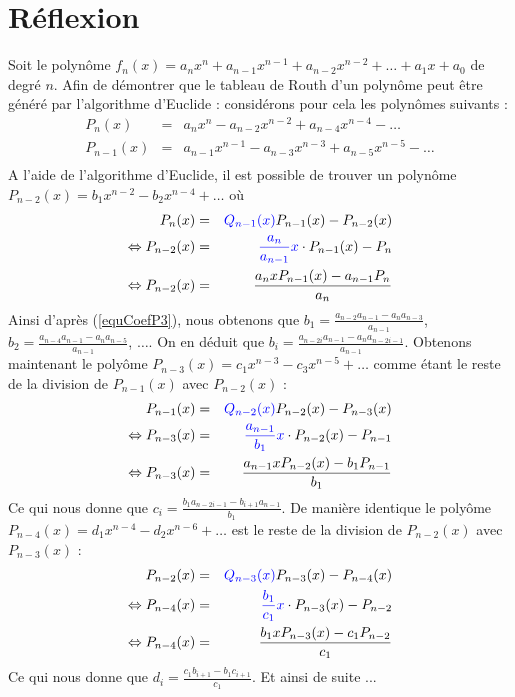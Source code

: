 \documentclass[11pt]{article}
\begin{document}
\clearpage
\section*{Réflexion}
Soit le polynôme $f_n(x) = a_n x^{n} + a_{n-1}x^{n-1} + a_{n-2}x^{n-2}+\dots + a_1x+a_0$ de degré $n$. Afin de démontrer que le tableau de Routh d'un polynôme
peut être généré par l'algorithme d'Euclide : considérons pour cela les polynômes suivants :
\begin{eqnarray}
  P_n(x)&=& a_nx^n-a_{n-2}x^{n-2}+a_{n-4}x^{n-4}-\dots\\
  P_{n-1}(x)&=& a_{n-1}x^{n-1}-a_{n-3}x^{n-3}+a_{n-5}x^{n-5}-\dots\\
\end{eqnarray}
A l'aide de l'algorithme d'Euclide, il est possible de trouver un polynôme $P_{n-2} (x) = b_{1}x^{n-2}-b_{2}x^{n-4}+\dots$ où
\begin{eqnarray}
  P_n (x)   &=& \color{blue}{Q_{n-1}(x)} \color{black}P_{n-1}(x)-P_{n-2}(x) \nonumber\\
  \Leftrightarrow P_{n-2}(x) &=& \color{blue}\frac{a_n}{a_{n-1}}x\color{black} \cdot P_{n-1}(x) - P_{n} \nonumber\\
  \Leftrightarrow P_{n-2}(x) &=& \frac{a_n x P_{n-1}(x) - a_{n-1}P_n}{a_n} \label{equCoefP3}
\end{eqnarray}
Ainsi d'après (\ref{equCoefP3}), nous obtenons que $b_1 = \frac{a_{n-2}a_{n-1}-a_n a_{n-3}}{a_{n-1}}$,
$b_2 = \frac{a_{n-4}a_{n-1}-a_n a_{n-5}}{a_{n-1}}$, $\dots$. On en déduit que $b_i = \frac{a_{n-2i}a_{n-1}-a_n a_{n-2i-1}}{a_{n-1}}$.
Obtenons maintenant le polyôme $P_{n-3}(x) = c_1x^{n-3}-c_3x^{n-5}+\dots$ comme étant le reste de la division de $P_{n-1}(x)$ avec $P_{n-2}(x)$ :
\begin{eqnarray}
  P_{n-1} (x)   &=& \color{blue}{Q_{n-2}(x)} \color{black}P_{n-2}(x)-P_{n-3}(x) \nonumber\\
  \Leftrightarrow P_{n-3}(x) &=& \color{blue}\frac{a_{n-1}}{b_1}x\color{black} \cdot P_{n-2}(x) - P_{n-1} \nonumber\\
  \Leftrightarrow P_{n-3}(x) &=& \frac{a_{n-1} x P_{n-2}(x) - b_1P_{n-1}}{b_1}
\end{eqnarray}
Ce qui nous donne que $c_i = \frac{b_1a_{n-2i-1}-b_{i+1}a_{n-1}}{b_1}$.
De manière identique le polyôme $P_{n-4}(x) = d_1x^{n-4}-d_2x^{n-6}+\dots$ est le reste de la division de $P_{n-2}(x)$ avec $P_{n-3}(x)$ :
\begin{eqnarray}
  P_{n-2} (x)   &=& \color{blue}{Q_{n-3}(x)} \color{black}P_{n-3}(x)-P_{n-4}(x) \nonumber\\
  \Leftrightarrow P_{n-4}(x) &=& \color{blue}\frac{b_1}{c_1}x\color{black} \cdot P_{n-3}(x) - P_{n-2} \nonumber\\
  \Leftrightarrow P_{n-4}(x) &=& \frac{b_1 x P_{n-3}(x) - c_1P_{n-2}}{c_1}
\end{eqnarray}
Ce qui nous donne que $d_i = \frac{c_1b_{i+1}-b_1c_{i+1}}{c_1}$. Et ainsi de suite ...\\
\end{document}
